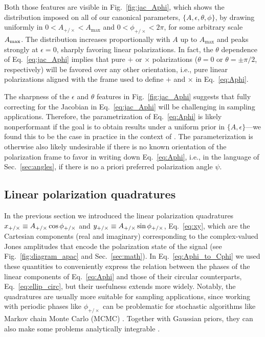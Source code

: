 \documentclass[aps,prd,twocolumn,superscriptaddress,preprintnumbers,floatfix,nofootinbib]{revtex4-2}
\newcommand*{\eq}[1]{Eq.~\eqref{eq:#1}}
\begin{document}
Both those features are visible in Fig.~\ref{fig:jac_Aphi}, which shows the distribution imposed on all of our canonical parameters, $\{A,\epsilon, \theta, \phi\}$, by drawing uniformly in $0 < A_{+/\times} < A_{\max}$ and $0 < \phi_{+/\times} < 2\pi$, for some arbitrary scale $A_{\rm max}$.
The distribution increases proportionally with $A$ up to $A_{\max}$ and peaks strongly at $\epsilon = 0$, sharply favoring linear polarizations.
In fact, the $\theta$ dependence of \eq{jac_Aphi} implies that pure $+$ or $\times$ polarizations ($\theta=0$ or $\theta = \pm\pi/2$, respectively) will be favored over any other orientation, i.e., pure linear polarizations aligned with the frame used to define $+$ and $\times$ in \eq{Aphi}.

The sharpness of the $\epsilon$ and $\theta$ features in Fig.~\ref{fig:jac_Aphi} suggests that fully correcting for the Jacobian in \eq{jac_Aphi} will be challenging in sampling applications.
Therefore, the parametrization of \eq{Aphi} is likely nonperformant if the goal is to obtain results under a uniform prior in $\{A,\epsilon\}$---we found this to be the case in practice in the context of \cite{Chatziioannou:2021mij}.
The parameterization is otherwise also likely undesirable if there is no known orientation of the polarization frame to favor in writing down \eq{Aphi}, i.e., in the language of Sec.~\ref{sec:angles}, if there is no a priori preferred polarization angle $\psi$.

\subsection{Linear polarization quadratures}
\label{sec:jac:Axy}

In the previous section we introduced the linear polarization quadratures $x_{+/\times} \equiv A_{+/\times} \cos \phi_{+/\times}$ and $y_{+/\times} \equiv A_{+/\times} \sin \phi_{+/\times}$, \eq{xy}, which are the Cartesian components (real and imaginary) corresponding to the complex-valued Jones amplitudes that encode the polarization state of the signal (see Fig.~\ref{fig:diagram_apac} and Sec.~\ref{sec:math}).
In \eq{Aphi_to_Cphi} we used these quantities to conveniently express the relation between the phases of the linear components of \eq{Aphi} and those of their circular counterparts, \eq{ellip_circ}, but their usefulness extends more widely.
Notably, the quadratures are usually more suitable for sampling applications, since working with periodic phases like $\phi_{+/\times}$ can be problematic for stochastic algorithms like Markov chain Monte Carlo (MCMC) \cite{Hogg:2017akh}.
Together with Gaussian priors, they can also make some problems analytically integrable \cite{Hogg:2020jwh}.
\end{document}

